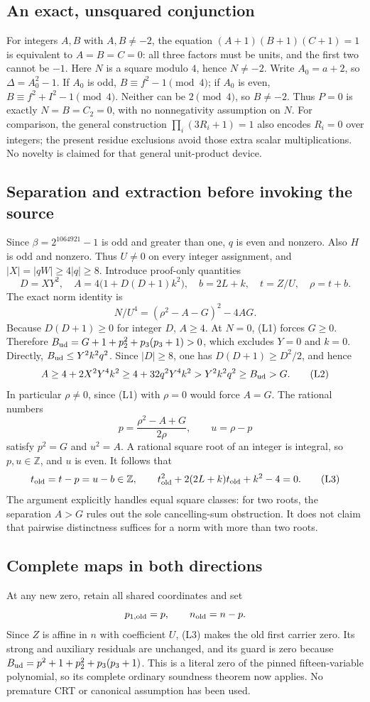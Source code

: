 \subsection{An exact, unsquared conjunction}
For integers $A,B$ with $A,B\ne-2$, the equation
$(A+1)(B+1)(C+1)=1$ is equivalent to $A=B=C=0$: all three factors must be units,
and the first two cannot be $-1$.
Here $N$ is a square modulo $4$, hence $N\ne-2$. Write $A_0=a+2$, so
$\Delta=A_0^2-1$. If $A_0$ is odd, $B\equiv f^2-1\pmod4$; if $A_0$ is even,
$B\equiv f^2+I^2-1\pmod4$. Neither can be $2\pmod4$, so $B\ne-2$.
Thus $P=0$ is exactly $N=B=C_2=0$, with no nonnegativity assumption on $N$.
For comparison, the general construction $\prod_i(3R_i+1)=1$ also encodes
$R_i=0$ over integers; the present residue exclusions avoid those extra scalar
multiplications. No novelty is claimed for that general unit-product device.

\subsection{Separation and extraction before invoking the source}
Since $\beta=2^{1064921}-1$ is odd and greater than one, $q$ is even and nonzero.
Also $H$ is odd and nonzero. Thus $U\ne0$ on every integer assignment, and
$|X|=|qW|\ge4|q|\ge8$.
Introduce proof-only quantities
\[
 D=XY^2,\quad A=4\bigl(1+D(D+1)k^2\bigr),\quad
 b=2L+k,\quad t=Z/U,\quad\rho=t+b.
\]
The exact norm identity is
\[
 N/U^4=(\rho^2-A-G)^2-4AG. \tag{L1}
\]
Because $D(D+1)\ge0$ for integer $D$, $A\ge4$. At $N=0$, (L1) forces
$G\ge0$. Therefore $B_{\rm ud}=G+1+p_2^2+p_3(p_3+1)>0$, which excludes
$Y=0$ and $k=0$. Directly, $B_{\rm ud}\le Y^2k^2q^2$. Since
$|D|\ge8$, one has $D(D+1)\ge D^2/2$, and hence
\[
 A\ge4+2X^2Y^4k^2\ge4+32q^2Y^4k^2
   >Y^2k^2q^2\ge B_{\rm ud}>G. \tag{L2}
\]
In particular $\rho\ne0$, since (L1) with $\rho=0$ would force $A=G$.
The rational numbers
\[
 p=\frac{\rho^2-A+G}{2\rho},\qquad u=\rho-p
\]
satisfy $p^2=G$ and $u^2=A$. A rational square root of an integer is integral,
so $p,u\in\mathbb Z$, and $u$ is even. It follows that
\[
 t_{\rm old}=t-p=u-b\in\mathbb Z,\qquad
 t_{\rm old}^2+2(2L+k)t_{\rm old}+k^2-4=0. \tag{L3}
\]
The argument explicitly handles equal square classes: for two roots, the
separation $A>G$ rules out the sole cancelling-sum obstruction. It does not
claim that pairwise distinctness suffices for a norm with more than two roots.

\subsection{Complete maps in both directions}
At any new zero, retain all shared coordinates and set
\[
 p_{1,\rm old}=p,\qquad n_{\rm old}=n-p.
\]
Since $Z$ is affine in $n$ with coefficient $U$, (L3) makes the old first carrier
zero. Its strong and auxiliary residuals are unchanged, and its guard is zero
because $B_{\rm ud}=p^2+1+p_2^2+p_3(p_3+1)$. This is a literal zero of the
pinned fifteen-variable polynomial, so its complete ordinary soundness theorem
now applies. No premature CRT or canonical assumption has been used.

